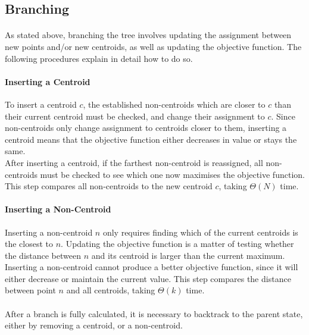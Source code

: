 \subsection{Branching}
\paragraph{}
As stated above, branching the tree involves updating the assignment between new points and/or new centroids, as well as updating the objective function. The following procedures explain in detail how to do so.
\paragraph{Inserting a Centroid}
To insert a centroid $c$, the established non-centroids which are closer to $c$ than their current centroid must be checked, and change their assignment to $c$.
Since non-centroids only change assignment to centroids closer to them, inserting a centroid means that the objective function either decreases in value or stays the same.\\
After inserting a centroid, if the farthest non-centroid is reassigned, all non-centroids must be checked to see which one now maximises the objective function.
This step compares all non-centroids to the new centroid $c$, taking $\Theta(N)$ time.

\paragraph{Inserting a Non-Centroid}
Inserting a non-centroid $n$ only requires finding which of the current centroids is the closest to $n$. Updating the objective function is a matter of testing whether the distance between $n$ and its centroid is larger than the current maximum.
Inserting a non-centroid cannot produce a better objective function, since it will either decrease or maintain the current value. 
This step compares the distance between point $n$ and all centroids, taking $\Theta(k)$ time.
\paragraph{}
After a branch is fully calculated, it is necessary to backtrack to the parent state, either by removing a centroid, or a non-centroid.
